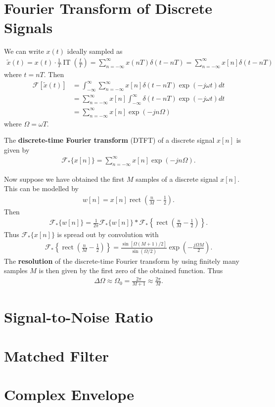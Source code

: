 \documentclass{memoir}
\newcommand{\rect}{\operatorname{rect}}
\newcommand{\IT}{\operatorname{IT}}
\newcommand{\F}{\mathcal{F}}
\begin{document}
\section{Fourier Transform of Discrete Signals}
We can write $x(t)$ ideally sampled as
\begin{align*}
    \tilde{x}(t) = x(t) \cdot \frac{1}{T}\IT\left(\frac{t}{T}\right) = \sum_{n=-\infty}^{\infty} x(nT) \delta(t - nT) = \sum_{n=-\infty}^{\infty} x[n] \delta(t - nT)
\end{align*}
where $t = nT$. Then
\begin{align*}
    \F[\tilde{x}(t)] &= \int_{-\infty}^{\infty} \sum_{n=-\infty}^{\infty} x[n] \delta(t - nT) \exp(-j \omega t) dt \\
    &= \sum_{n=-\infty}^{\infty} x[n] \int_{-\infty}^{\infty}  \delta(t - nT) \exp(-j \omega t) dt \\
    &= \sum_{n=-\infty}^{\infty} x[n] \exp(-j n \Omega)
\end{align*}
where $\Omega = \omega T$.
\begin{definition}
    The \textbf{discrete-time Fourier transform} (DTFT) of a discrete signal $x[n]$ is given by
    \begin{align*}
        \F_*\{x[n]\} = \sum_{n=-\infty}^{\infty} x[n] \exp(-j n \Omega).
    \end{align*}
\end{definition}
Now suppose we have obtained the first $M$ samples of a discrete signal $x[n]$. This can be modelled by
\begin{align*}
    w[n] = x[n]\rect\left(\frac{n}{M} - \frac{1}{2}\right).
\end{align*}
Then
\begin{align*}
    \F_*\{w[n]\} = \frac{1}{2 \pi} \F_*\{w[n]\} \ast \F_*\left\{\rect\left(\frac{n}{M} - \frac{1}{2}\right)\right\}.
\end{align*}
Thus $\F_*\{x[n]\}$ is spread out by convolution with
\begin{align*}
    \F_*\left\{\rect\left(\frac{n}{M} - \frac{1}{2}\right)\right\} = \frac{\sin[\Omega(M+1)/2]}{\sin(\Omega/2)}\exp\left(-\frac{j \Omega M}{2}\right).
\end{align*}
The \textbf{resolution} of the discrete-time Fourier transform by using finitely many samples $M$ is then given by the first zero of the obtained function. Thus
\begin{align*}
    \Delta \Omega \approx \Omega_0 = \frac{2 \pi}{M+1} \approx \frac{2 \pi}{M}.
\end{align*}

\section{Signal-to-Noise Ratio}

\section{Matched Filter}

\section{Complex Envelope}
\end{document}
